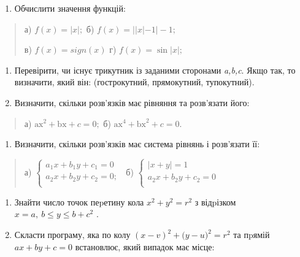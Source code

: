 \documentclass[]{article}
\begin{document}
\begin{enumerate}
\def\labelenumi{\arabic{enumi})}
\setcounter{enumi}{7}
\item
  Обчислити значення функцій:
\end{enumerate}

\begin{quote}
а) \(f(x) = |x|;\) б) \(f(x) = ||x| - 1| - 1;\)

в) \(f(x) = sign(x)\) г) \(f(x) = \mathrm{\sin}|x|;\)
\end{quote}

\begin{enumerate}
\def\labelenumi{\arabic{enumi})}
\setcounter{enumi}{7}
\item
  Перевірити, чи існує трикутник із заданими сторонами \emph{a,b,c}.
  Якщо так, то визначити, який він: (гострокутний, прямокутний,
  тупокутний).
\item
  Визначити, скільки розв'язків має рівняння та розв'язати його:
\end{enumerate}

\begin{quote}
а) \(\mathrm{\text{ax}}^{2} + \mathrm{\text{bx}} + c = 0;\) б)
\(\mathrm{\text{ax}}^{4} + \mathrm{\text{bx}}^{2} + c = 0\mathrm{.}\)
\end{quote}

\begin{enumerate}
\def\labelenumi{\arabic{enumi})}
\setcounter{enumi}{7}
\item
  Визначити, скільки розв'язків має система рівнянь і розв'язати її:
\end{enumerate}

\begin{quote}
а) \(\left\{ \begin{matrix}
a_{1}x + b_{1}y + c_{1} = 0 \\
a_{2}x + b_{2}y + c_{2} = 0; \\
\end{matrix} \right.\ \) б) \(\left\{ \begin{matrix}
\left| x + y \right| = 1 \\
a_{2}x + b_{2}y + c_{2} = 0 \\
\end{matrix} \right.\ \)
\end{quote}

\begin{enumerate}
\def\labelenumi{\arabic{enumi})}
\setcounter{enumi}{7}
\item
  Знайти число точок пеpетину кола \(x^{2} + y^{2} = r^{2}\) з відpізком
  \(x = a,\ b \leq y \leq b + c^{2}\) .
\item
  Скласти програму, яка по колу
  \({(x - v)}^{2} + ({y - u)}^{2} = r^{2}\) та пpямій
  \(ax + by + c = 0\) встановлює, який випадок має місце:
\end{enumerate}
\end{document}
